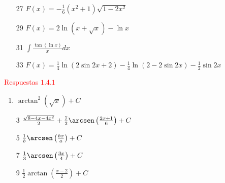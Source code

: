 \begin{multicols}{2}
\begin{enumerate}

 \item[27] $F(x)=-\frac{1}{6}\left( x^{2}+1\right) \sqrt{1-2x^{2}}$  

 

 \item[29] $F(x)=2\ln \left( x+\sqrt{x}\right) -\ln x$  


\item[31] $\displaystyle\int\frac{\tan(\ln x)}{x}dx$ \newline

 

\item[33] $F(x)=\frac{1}{4}\ln\left( 2\sin 2x+2\right) -\frac{1}{4}\ln \left( 2-2\sin 2x\right) -\frac{1}{2%
}\sin 2x\allowbreak $  

\end{enumerate}

 

\textcolor{red}{Respuestas $1.4.1$} \\

 
\begin{enumerate}
\item  $\arctan^2(\sqrt{x})+C$ \\
\item[3]    $\frac{\sqrt{8-4x-4x^2}}{2}+\frac{7}{2}\arcsen\left(\frac{2x+1}{6}\right)+C$ \\
\item[5] $\frac{1}{b}\arcsen\left(\frac{bx}{a}\right)+C$ \\
\item[7] $\frac{1}{3}\arcsen\left(\frac{3x}{4} \right)+C$ \\
\item[9]  $\frac{1}{2}\arctan\left(\frac{x-2}{2}\right)+C$ \\
\end{enumerate}



\end{multicols}
